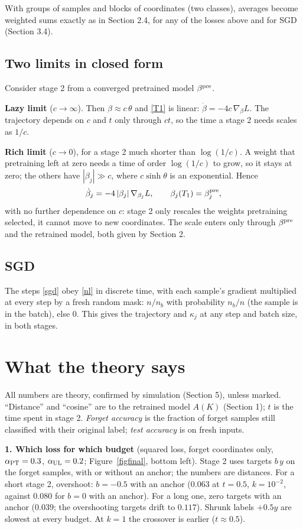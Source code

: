 \documentclass[10pt]{article}
\begin{document}
With groups of samples and blocks of coordinates (two classes), averages become weighted sums exactly as in Section 2.4, for any of the losses above and for SGD (Section 3.4).

\subsection{Two limits in closed form}
Consider stage 2 from a converged pretrained model $\beta^{\rm pre}$.

\textbf{Lazy limit} ($c\to\infty$). Then $\beta\approx c\,\theta$ and \eqref{T1} is linear: $\dot\beta=-4c\,\nabla_\beta L$. The trajectory depends on $c$ and $t$ only through $ct$, so the time a stage 2 needs scales as $1/c$.

\textbf{Rich limit} ($c\to0$), for a stage 2 much shorter than $\log(1/c)$. A weight that pretraining left at zero needs a time of order $\log(1/c)$ to grow, so it stays at zero; the others have $|\beta_j|\gg c$, where $c\sinh\theta$ is an exponential. Hence
\begin{equation}\label{mult}
\dot\beta_j=-4\,|\beta_j|\,\nabla_{\beta_j}L,\qquad\beta_j(T_1)=\beta^{\rm pre}_j ,
\end{equation}
with no further dependence on $c$: stage 2 only rescales the weights pretraining selected, it cannot move to new coordinates. The scale enters only through $\beta^{\rm pre}$ and the retrained model, both given by Section 2.

\subsection{SGD}
The steps \eqref{sgd} obey \eqref{nl} in discrete time, with each sample's gradient multiplied at every step by a fresh random mask: $n/n_b$ with probability $n_b/n$ (the sample is in the batch), else $0$. This gives the trajectory and $\kappa_j$ at any step and batch size, in both stages.

\section{What the theory says}
All numbers are theory, confirmed by simulation (Section 5), unless marked. ``Distance'' and ``cosine'' are to the retrained model $A(K)$ (Section 1); $t$ is the time spent in stage 2. \emph{Forget accuracy} is the fraction of forget samples still classified with their original label; \emph{test accuracy} is on fresh inputs.

\textbf{1. Which loss for which budget} (squared loss, forget coordinates only, $\alpha_{\rm PT}=0.3$, $\alpha_{\rm UL}=0.2$; Figure~\ref{figfinal}, bottom left). Stage 2 uses targets $b\,y$ on the forget samples, with or without an anchor; the numbers are distances. For a short stage 2, overshoot: $b=-0.5$ with an anchor ($0.063$ at $t=0.5$, $k=10^{-2}$, against $0.080$ for $b=0$ with an anchor). For a long one, zero targets with an anchor ($0.039$; the overshooting targets drift to $0.117$). Shrunk labels $+0.5y$ are slowest at every budget. At $k=1$ the crossover is earlier ($t\approx0.5$).
\end{document}

